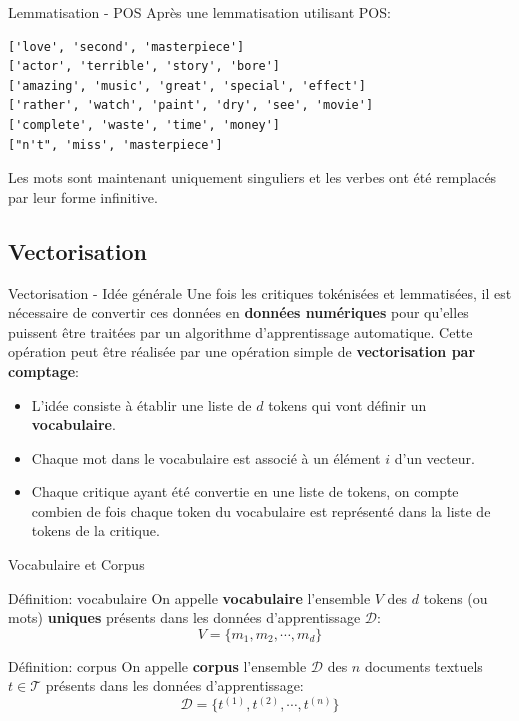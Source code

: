 \documentclass[10pt]{beamer}  %
\begin{document}
\begin{frame}[fragile]{Lemmatisation - POS}
	Après une lemmatisation utilisant POS:
	\begin{lstlisting}
['love', 'second', 'masterpiece']
['actor', 'terrible', 'story', 'bore']
['amazing', 'music', 'great', 'special', 'effect']
['rather', 'watch', 'paint', 'dry', 'see', 'movie']
['complete', 'waste', 'time', 'money']
["n't", 'miss', 'masterpiece']
	\end{lstlisting}
	Les mots sont maintenant uniquement singuliers et les verbes ont été remplacés par leur forme infinitive.
\end{frame}

\subsection[Vectorisation]{Vectorisation}

\begin{frame}{Vectorisation - Idée générale}
	Une fois les critiques tokénisées et lemmatisées, il est nécessaire de convertir ces données en \textbf{données numériques} pour qu'elles puissent être traitées par un algorithme d'apprentissage automatique. Cette opération peut être réalisée par une opération simple de \textbf{vectorisation par comptage}:
	\begin{itemize}
		\item L'idée consiste à établir une liste de $d$ tokens qui vont définir un \textbf{vocabulaire}.
		\item Chaque mot dans le vocabulaire est associé à un élément $i$ d'un vecteur.
		\item Chaque critique ayant été convertie en une liste de tokens, on compte combien de fois chaque token du vocabulaire est représenté dans la liste de tokens de la critique.
	\end{itemize}	
\end{frame}

\begin{frame}{Vocabulaire et Corpus}
	\begin{block}{Définition: vocabulaire}
		On appelle \textbf{vocabulaire} l'ensemble $V$ des $d$ tokens (ou mots) \textbf{uniques} présents dans les données d'apprentissage $\mathcal{D}$:
		\begin{equation}
			V = \{m_1, m_2, \cdots, m_d\}
			\nonumber
		\end{equation}
	\end{block}
	\pause
	\begin{block}{Définition: corpus}
		On appelle \textbf{corpus} l'ensemble $\mathcal{D}$ des $n$ documents textuels $t \in \mathcal{T}$  présents dans les données d'apprentissage:
		\begin{equation}
			\mathcal{D} = \{t^{(1)}, t^{(2)}, \cdots, t^{(n)}\}
			\nonumber
		\end{equation}
	\end{block}	
\end{frame}
\end{document}
